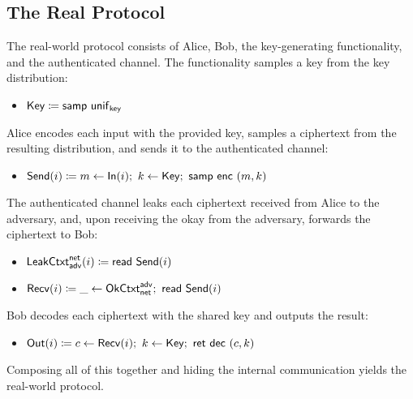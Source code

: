 \subsection{The Real Protocol}
The real-world protocol consists of Alice, Bob, the key-generating functionality, and the authenticated channel. The functionality samples a key from the key distribution:
\begin{itemize}
\item $\mathsf{Key} \coloneqq \mathsf{samp} \ \mathsf{unif}_{\mathsf{key}}$
\end{itemize}
Alice encodes each input with the provided key, samples a ciphertext from the resulting distribution, and sends it to the authenticated channel: 
\begin{itemize}
\item $\mathsf{Send}(i) \coloneqq m \leftarrow \mathsf{In}(i); \ k \leftarrow \mathsf{Key}; \ \mathsf{samp} \ \mathsf{enc} \ (m,k)$
\end{itemize}
The authenticated channel leaks each ciphertext received from Alice to the adversary, and, upon receiving the okay from the adversary, forwards the ciphertext to Bob:
\begin{itemize}
\item $\mathsf{LeakCtxt}^{\mathsf{net}}_{\mathsf{adv}}(i) \coloneqq \mathsf{read} \ \mathsf{Send}(i)$
\item $\mathsf{Recv}(i) \coloneqq \_ \leftarrow \mathsf{OkCtxt}^{\mathsf{adv}}_{\mathsf{net}}; \ \mathsf{read} \ \mathsf{Send}(i)$
\end{itemize}
Bob decodes each ciphertext with the shared key and outputs the result:
\begin{itemize}
\item $\mathsf{Out}(i) \coloneqq c \leftarrow \mathsf{Recv}(i); \ k \leftarrow \mathsf{Key}; \ \mathsf{ret} \ \mathsf{dec} \ (c,k)$
\end{itemize}
Composing all of this together and hiding the internal communication yields the real-world protocol.

